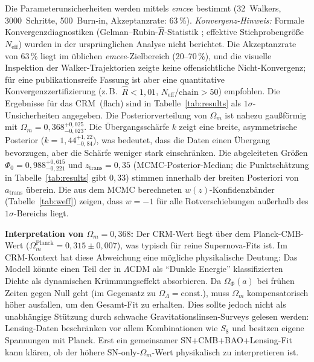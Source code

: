 \documentclass[aps,prd,twocolumn,superscriptaddress,nofootinbib]{revtex4-2}
\begin{document}
Die Parameterunsicherheiten werden mittels \textit{emcee} \cite{ForemanMackey2013} bestimmt (32~Walkers, 3000~Schritte, 500~Burn-in, Akzeptanzrate: 63\,\%). \textit{Konvergenz-Hinweis:} Formale Konvergenzdiagnostiken (Gelman--Rubin-$\hat{R}$-Statistik \cite{GelmanRubin1992}; effektive Stichprobengr\"o\ss{}e $N_\mathrm{eff}$) wurden in der urspr\"unglichen Analyse nicht berichtet. Die Akzeptanzrate von 63\,\% liegt im \"ublichen \textit{emcee}-Zielbereich (20--70\,\%), und die visuelle Inspektion der Walker-Trajektorien zeigte keine offensichtliche Nicht-Konvergenz; f\"ur eine publikationsreife Fassung ist aber eine quantitative Konvergenzzertifizierung (z.\,B.\ $\hat{R}<1{,}01$, $N_\mathrm{eff}/\mathrm{chain}>50$) empfohlen. Die Ergebnisse f\"ur das CRM~(flach) sind in Tabelle~\ref{tab:results} als $1\sigma$-Unsicherheiten angegeben. Die Posteriorverteilung von $\Omega_m$ ist nahezu gau\ss{}f\"ormig mit $\Omega_m = 0{,}368^{+0{,}025}_{-0{,}023}$. Die \"Ubergangssch\"arfe $k$ zeigt eine breite, asymmetrische Posterior ($k = 1{,}44^{+1{,}22}_{-0{,}84}$), was bedeutet, dass die Daten einen \"Ubergang bevorzugen, aber die Sch\"arfe weniger stark einschr\"anken. Die abgeleiteten Gr\"o\ss{}en $\Phi_0 = 0{,}988^{+0{,}615}_{-0{,}221}$ und $z_{\mathrm{trans}} = 0{,}35$ (MCMC-Posterior-Median; die Punktsch\"atzung in Tabelle~\ref{tab:results} gibt $0{,}33$) stimmen innerhalb der breiten Posteriori von $a_{\mathrm{trans}}$ \"uberein. Die aus dem MCMC berechneten $w(z)$-Konfidenzb\"ander (Tabelle~\ref{tab:weff}) zeigen, dass $w = -1$ f\"ur alle Rotverschiebungen au\ss{}erhalb des $1\sigma$-Bereichs liegt.

\textbf{Interpretation von $\Omega_m = 0{,}368$:} Der CRM-Wert liegt über dem Planck-CMB-Wert ($\Omega_m^{\mathrm{Planck}} = 0{,}315 \pm 0{,}007$), was typisch für reine Supernova-Fits ist. Im CRM-Kontext hat diese Abweichung eine mögliche physikalische Deutung: Das Modell könnte einen Teil der in $\Lambda$CDM als ``Dunkle Energie'' klassifizierten Dichte als dynamischen Krümmungseffekt absorbieren. Da $\Omega_\Phi(a)$ bei frühen Zeiten gegen Null geht (im Gegensatz zu $\Omega_\Lambda = \mathrm{const.}$), muss $\Omega_m$ kompensatorisch höher ausfallen, um den Gesamt-Fit zu erhalten. Dies sollte jedoch nicht als unabhängige Stützung durch schwache Gravitationslinsen-Surveys gelesen werden: Lensing-Daten beschränken vor allem Kombinationen wie $S_8$ und besitzen eigene Spannungen mit Planck. Erst ein gemeinsamer SN+CMB+BAO+Lensing-Fit kann klären, ob der höhere SN-only-$\Omega_m$-Wert physikalisch zu interpretieren ist.
\end{document}
